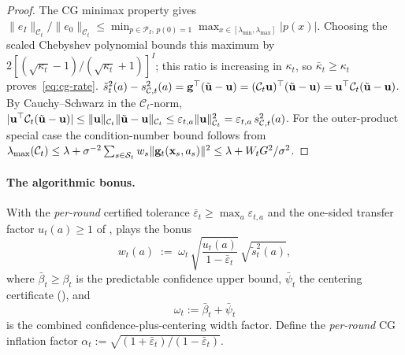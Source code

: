 \documentclass[twoside]{article}
\newcommand{\Calg}{\mathcal{C}}                 %
\begin{document}
\begin{proof}
The CG minimax property gives
$\|e_I\|_{\Calg_t}/\|e_0\|_{\Calg_t}
\le\min_{p\in\mathcal P_I,\,p(0)=1}
\max_{x\in[\lambda_{\min},\lambda_{\max}]}|p(x)|$.
Choosing the scaled Chebyshev polynomial bounds this maximum by
$2[(\sqrt{\kappa_t}-1)/(\sqrt{\kappa_t}+1)]^I$; this ratio is increasing in
$\kappa_t$, so $\bar\kappa_t\ge\kappa_t$ proves~\eqref{eq:cg-rate}.
$\tilde{s}_t^2(a) - s_{\Calg,t}^2(a)
= \bg^\top(\tilde\bu-\bu)
= (\Calg_t\bu)^\top(\tilde\bu-\bu)
= \bu^\top\Calg_t(\tilde\bu-\bu)$.
By Cauchy--Schwarz in the $\Calg_t$-norm,
$|\bu^\top\Calg_t(\tilde\bu-\bu)|
\le\|\bu\|_{\Calg_t}\|\tilde\bu-\bu\|_{\Calg_t}
\le\varepsilon_{t,a}\|\bu\|_{\Calg_t}^2 = \varepsilon_{t,a}\,s_{\Calg,t}^2(a)$.
For the outer-product special case the condition-number bound follows from
$\lambda_{\max}(\Calg_t)\le\lambda+\sigma^{-2}\sum_{s\in\mathcal{S}_t} w_s\|\bg_t(\bx_s,a_s)\|^2
\le\lambda+W_tG^2/\sigma^2$.
\end{proof}

\paragraph{The algorithmic bonus.}
With the \emph{per-round} certified tolerance
$\bar\varepsilon_t\ge\max_a\varepsilon_{t,a}$ and the one-sided transfer factor
$u_t(a)\ge1$ of ,  plays the bonus
\begin{equation}\label{eq:bonus}
  w_t(a)
  \;:=\;
  \omega_t\,
  \sqrt{\frac{u_t(a)}{1-\bar\varepsilon_t}}\,
  \sqrt{\tilde{s}_t^2(a)},
\end{equation}
where $\bar\beta_t\ge\beta_t$ is the predictable confidence upper bound,
$\bar\psi_t$ the centering certificate (), and
\begin{equation}\label{eq:omega-def}
  \omega_t := \bar\beta_t+\bar\psi_t
\end{equation}
is the combined confidence-plus-centering width factor.  Define the
\emph{per-round} CG inflation factor
$\alpha_t:=\sqrt{(1+\bar\varepsilon_t)/(1-\bar\varepsilon_t)}$.
\end{document}
